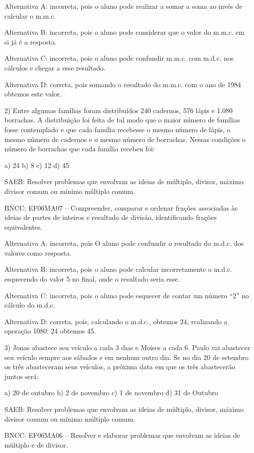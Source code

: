 Alternativa A: incorreta, pois o aluno pode realizar a somar a soma ao
invés de calcular o m.m.c.

Alternativa B: incorreta, pois o aluno pode considerar que o valor do
m.m.c. em si já é a resposta.

Alternativa C: incorreta, pois o aluno pode confundir m.m.c. com m.d.c.
nos cálculos e chegar a esse resultado.

Alternativa D: correta, pois somando o resultado do m.m.c. com o ano de
1984 obtemos este valor.

2) Entre algumas famílias foram distribuídos 240 cadernos, 576 lápis e
1.080 borrachas. A distribuição foi feita de tal modo que o maior número
de famílias fosse contemplado e que cada família recebesse o mesmo
número de lápis, o mesmo número de cadernos e o mesmo número de
borrachas. Nessas condições o número de borrachas que cada família
recebeu foi:

a) 24 b) 8 c) 12 d) 45

SAEB: Resolver problemas que envolvam as ideias de múltiplo, divisor,
máximo divisor comum ou mínimo múltiplo comum.

BNCC: EF06MA07 -- Compreender, comparar e ordenar frações associadas às
ideias de partes de inteiros e resultado de divisão, identificando
frações equivalentes.

Alternativa A: incorreta, pois O aluno pode confundir o resultado do
m.d.c. dos valores como resposta.

Alternativa B: incorreta, pois o aluno pode calcular incorretamente o
m.d.c. esquecendo do valor 5 no final, onde o resultado seria esse.

Alternativa C: incorreta, pois o aluno pode esquecer de contar um número
``2'' no cálculo do m.d.c.

Alternativa D: correta, pois, calculando o m.d.c., obtemos 24,
realizando a operação 1080: 24 obtemos 45.

3) Jonas abastece seu veículo a cada 3 dias e Moises a cada 6. Paulo vai
abastecer seu veículo sempre aos sábados e em nenhum outro dia. Se no
dia 20 de setembro os três abasteceram seus veículos, a próxima data em
que os três abastecerão juntos será:

a) 20 de outubro b) 2 de novembro c) 1 de novembro d) 31 de Outubro

SAEB: Resolver problemas que envolvam as ideias de múltiplo, divisor,
máximo divisor comum ou mínimo múltiplo comum.

BNCC: EF06MA06 -- Resolver e elaborar problemas que envolvam as ideias
de múltiplo e de divisor.

